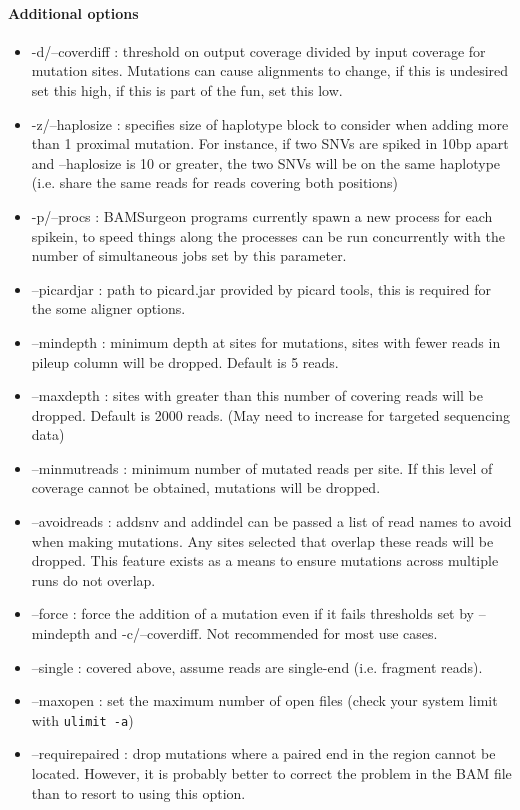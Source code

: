 \documentclass[letterpaper,11pt]{article}
\begin{document}
\paragraph{Additional options}
\begin{itemize}
\item -d/--coverdiff : threshold on output coverage divided by input coverage for mutation sites. Mutations can cause alignments to change, if this is undesired set this high, if this is part of the fun, set this low.
\item -z/--haplosize : specifies size of haplotype block to consider when adding more than 1 proximal mutation. For instance, if two SNVs are spiked in 10bp apart and --haplosize is 10 or greater, the two SNVs will be on the same haplotype (i.e. share the same reads for reads covering both positions)
\item -p/--procs : BAMSurgeon programs currently spawn a new process for each spikein, to speed things along the processes can be run concurrently with the number of simultaneous jobs set by this parameter.
\item --picardjar : path to picard.jar provided by picard tools, this is required for the some aligner options.
\item --mindepth : minimum depth at sites for mutations, sites with fewer reads in pileup column will be dropped. Default is 5 reads.
\item --maxdepth : sites with greater than this number of covering reads will be dropped. Default is 2000 reads. (May need to increase for targeted sequencing data)
\item --minmutreads : minimum number of mutated reads per site. If this level of coverage cannot be obtained, mutations will be dropped.
\item --avoidreads : addsnv and addindel can be passed a list of read names to avoid when making mutations. Any sites selected that overlap these reads will be dropped. This feature exists as a means to ensure mutations across multiple runs do not overlap.
\item --force : force the addition of a mutation even if it fails thresholds set by --mindepth and -c/--coverdiff. Not recommended for most use cases.
\item --single : covered above, assume reads are single-end (i.e. fragment reads).
\item --maxopen : set the maximum number of open files (check your system limit with \texttt{ulimit -a})
\item --requirepaired : drop mutations where a paired end in the region cannot be located. However, it is probably better to correct the problem in the BAM file than to resort to using this option.

\end{itemize}
\end{document}
